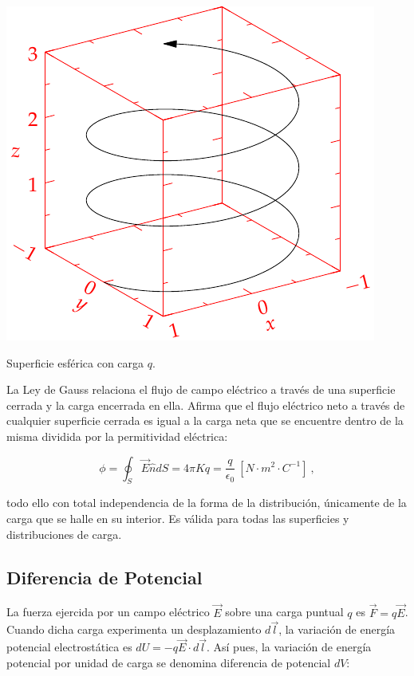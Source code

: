 \documentclass{tufte-handout}
\begin{document}
\begin{marginfigure}%
    \includegraphics[width=\linewidth]{helix}
    \caption{Superficie esférica con carga $q$.}
    \label{fig:esferagauss}
\end{marginfigure}

La Ley de Gauss relaciona el flujo de campo eléctrico a través de una superficie cerrada y la carga encerrada en ella. Afirma que el flujo eléctrico neto a través de cualquier superficie cerrada es igual a la carga neta que se encuentre dentro de la misma dividida por la permitividad eléctrica:

\begin{equation}
\phi = \oint_S \vec{E}\hat{n}dS = 4\pi Kq = \frac{q}{\epsilon_0}~[N\cdot m^2 \cdot C^{-1}]~,
\end{equation}

todo ello con total independencia de la forma de la distribución, únicamente de la carga que se halle en su interior. Es válida para todas las superficies y distribuciones de carga.

\subsection{Diferencia de Potencial}

La fuerza ejercida por un campo eléctrico $\vec{E}$ sobre una carga puntual $q$ es $\vec{F} = q\vec{E}$. Cuando dicha carga experimenta un desplazamiento $d\vec{l}$, la variación de energía potencial electrostática es $dU = -q\vec{E}\cdot d\vec{l}$. Así pues, la variación de energía potencial por unidad de carga se denomina diferencia de potencial $dV$:
\end{document}
